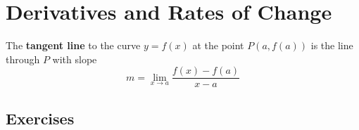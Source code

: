 \section{Derivatives and Rates of Change}
\begin{definition}
	The \textbf{tangent line} to the curve $y = f\left(x\right)$ at the point $P\left(a, f\left(a\right)\right)$ is the line through $P$ with slope
	\begin{equation}
	\label{equation-tangent-line}
	m = \lim\limits_{x \to a} \frac{f\left(x\right) - f\left(a\right)}{x - a}
	\end{equation}
\end{definition}

\subsection{Exercises}
